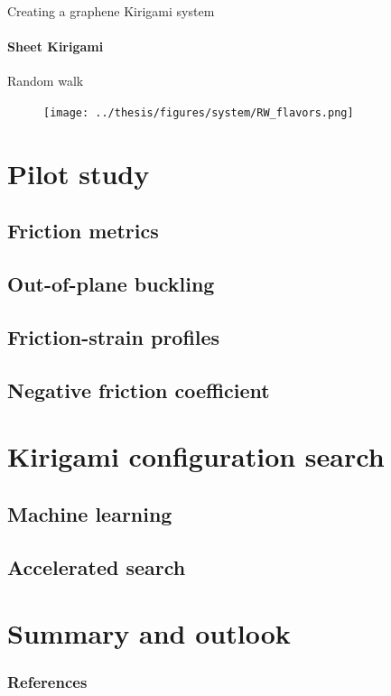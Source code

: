 \documentclass[
	10pt, %
]{beamer}
\begin{document}
%
%
\begin{frame}{Creating a graphene Kirigami system}
	\framesubtitle{Sheet Kirigami}
	Random walk 
	\begin{figure}[H]
		\centering
		\texttt{[image: ../thesis/figures/system/RW\_flavors.png]}
	\end{figure}
\end{frame}
%
%






\section{Pilot study} %
\subsection{Friction metrics}
\subsection{Out-of-plane buckling}
\subsection{Friction-strain profiles}
\subsection{Negative friction coefficient}


\section{Kirigami configuration search} %
\subsection{Machine learning}
\subsection{Accelerated search}



\section{Summary and outlook} %



\begin{frame}%
	\frametitle{References}
	\printbibliography
\end{frame}
\end{document}
